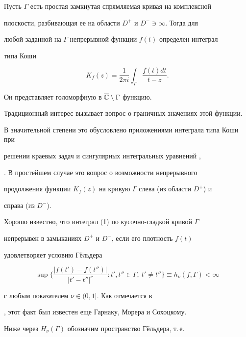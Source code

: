 Пусть $\Gamma$ есть простая замкнутая спрямляемая кривая на комплексной


плоскости, разбивающая ее на области $D^+$ и $D^{-}\ni\infty$. Тогда для


любой заданной на $\Gamma$ непрерывной функции $f(t)$ определен интеграл


типа Коши


\begin{equation}


K_{f}(z) = \frac{1}{2\pi i}\int_{\Gamma}{\frac{f(t)dt}{t-z}}.


\end{equation}


Он представляет голоморфную в $\overline{\Bbb C}\setminus\Gamma$ функцию.


Традиционный интерес вызывает вопрос о граничных значениях этой функции.


В значительной степени это обусловлено приложениями интеграла типа Коши при


решении краевых задач и сингулярных интегральных уравнений \cite{Ga},


\cite{Mu}. В простейшем случае это вопрос о возможности непрерывного


продолжения функции $K_{f}(z)$ на кривую $\Gamma$ слева (из области $D^+$) и


справа (из $D^-$).





Хорошо известно, что интеграл (1) по кусочно-гладкой кривой $\Gamma$


непрерывен в замыканиях $D^+$ и $D^-$, если его плотность $f(t)$


удовлетворяет условию Г\"ельдера


\begin{equation}


\sup \bigg\{\frac{\left| f(t')-f(t'')\right|}{\left| t'-t''\right|^{\nu}}


: t',t''\in \Gamma,\ t'\ne t''\bigg\}\equiv h_{\nu}(f,\Gamma)<\infty


\end{equation}


с любым показателем $\nu\in (0,1]$. Как отмечается в


\cite{Mu}, этот факт был известен еще Гарнаку, Морера и Сохоцкому.





Ниже через $H_{\nu}(\Gamma)$ обозначим пространство Г\"ельдера, т.\,е.


